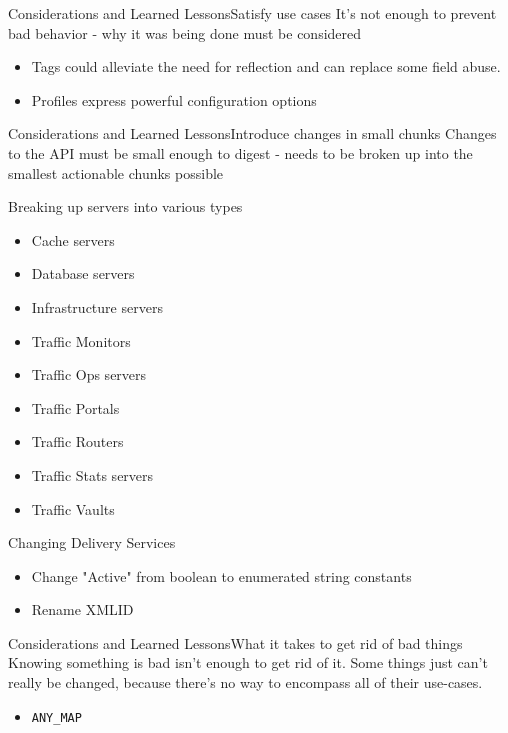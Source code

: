 \documentclass[10pt]{beamer}
\newcommand{\code}[1]{\texorpdfstring{\texttt{\color{inlinecodecolor}#1}}{#1}}
\begin{document}
\begin{frame}{Considerations and Learned Lessons}{Satisfy use cases}
It's not enough to prevent bad behavior - why it was being done must be
considered

	\begin{itemize}
		\item<2-> Tags could alleviate the need for reflection and can replace some field abuse.
		\item<3-> Profiles express powerful configuration options
	\end{itemize}
\end{frame}

\begin{frame}{Considerations and Learned Lessons}{Introduce changes in small chunks}
Changes to the API must be small enough to digest - needs to be broken up into
the smallest actionable chunks possible

	\begin{overprint}
			\begin{block}{Breaking up servers into various types}
				\begin{itemize}
					\item Cache servers
					\item Database servers
					\item Infrastructure servers
					\item Traffic Monitors
					\item Traffic Ops servers
					\item Traffic Portals
					\item Traffic Routers
					\item Traffic Stats servers
					\item Traffic Vaults
				\end{itemize}
			\end{block}
			\begin{block}{Changing Delivery Services}
				\begin{itemize}
					\item Change "Active" from boolean to enumerated string constants
					\item Rename XMLID
				\end{itemize}
			\end{block}
	\end{overprint}
\end{frame}

\begin{frame}{Considerations and Learned Lessons}{What it takes to get rid of bad things}
Knowing something is bad isn't enough to get rid of it. Some things just can't
really be changed, because there's no way to encompass all of their use-cases.

	\begin{itemize}
		\item<2-> \code{ANY\_MAP}
	\end{itemize}
\end{frame}
\end{document}
